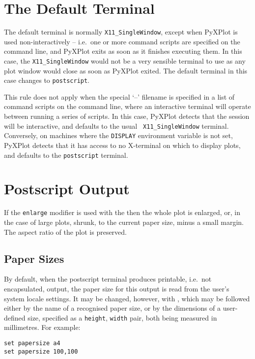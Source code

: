 \section{The Default Terminal}

The default terminal is normally {\tt X11\_SingleWindow}, except when PyXPlot
is used non-interactively -- i.e.\ one or more command scripts are specified on
the command line, and PyXPlot exits as soon as it finishes executing them. In
this case, the {\tt X11\_SingleWindow} would not be a very sensible terminal to
use as any plot window would close as soon as PyXPlot exited. The default
terminal in this case changes to {\tt postscript}.

This rule does not apply when the special `--' filename is specified in a list
of command scripts on the command line, where an interactive terminal will
operate between running a series of scripts. In this case, PyXPlot detects that
the session will be interactive, and defaults to the usual {\tt
X11\_SingleWindow} terminal. Conversely, on machines where the {\tt DISPLAY}
environment variable is not set, PyXPlot detects that it has access to no
X-terminal on which to display plots, and defaults to the {\tt postscript}
terminal.

\section{Postscript Output}

If the {\tt enlarge} modifier is used with the  then the
whole plot is enlarged, or, in the case of large plots, shrunk, to the current
paper size, minus a small margin. The aspect ratio of the plot is preserved.

\subsection{Paper Sizes}
\label{sec:set_papersize}

By default, when the postscript terminal produces printable, i.e.\ not
encapsulated, output, the paper size for this output is read from the user's
system locale settings. It may be changed, however, with , which may be followed either by the name of a recognised paper
size, or by the dimensions of a user-defined size, specified as a {\tt height},
{\tt width} pair, both being measured in millimetres. For example:

\begin{verbatim}
set papersize a4
set papersize 100,100
\end{verbatim}

